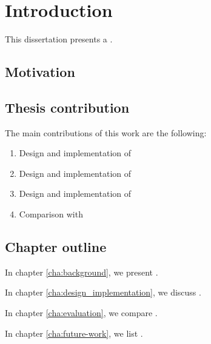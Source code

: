
\chapter{Introduction}

This dissertation presents a .

\section{Motivation}

\section{Thesis contribution}
  The main contributions of this work are the following:
  \begin{enumerate}
    \item Design and implementation of
    \item Design and implementation of
    \item Design and implementation of
    \item Comparison with
  \end{enumerate}

\section{Chapter outline}
  In chapter \ref{cha:background}, we present .

  In chapter \ref{cha:design_implementation}, we discuss .

  In chapter \ref{cha:evaluation}, we compare .

  In chapter \ref{cha:future-work}, we list .
